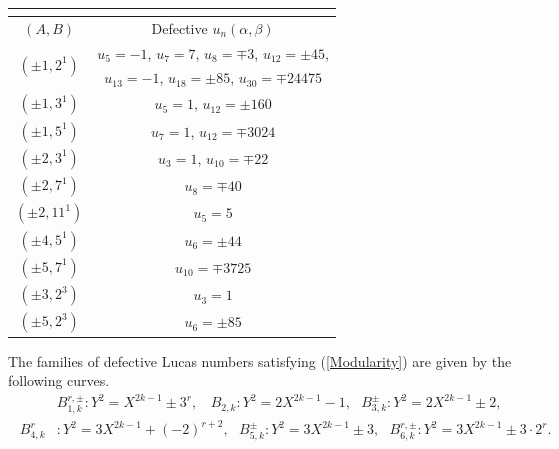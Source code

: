\documentclass[12pt]{amsart}
\newcommand{\?}{\color{red}?}
\numberwithin{equation}{section}
\begin{document}
\begingroup
\setlength{\tabcolsep}{3pt} %
\renewcommand{\arraystretch}{1.5}
\begin{center} %
\begin{table}[!ht]
\begin{tabular}{|c|c|}
\multicolumn{2}{c}{} \\ \hline
$(A,B)$ & Defective $u_n(\alpha, \beta)$ \\ \hline \hline
\multirow{2}{3.5em}{$(\pm 1,2^1)$} & $u_5 = -1$, $u_7 = 7$, $u_8 = \mp 3$, $u_{12} = \pm 45$, \\ & $u_{13} = -1$, $u_{18} = \pm 85$, $u_{30} = \mp 24475$ \\ \hline
$(\pm 1,3^1)$ & $u_5 = 1$, $u_{12} = \pm 160$ \\ \hline
$(\pm 1, 5^1)$ & $u_7 = 1$, $u_{12} = \mp 3024$ \\ \hline
$(\pm 2, 3^1)$ & $u_3 = 1$, $u_{10} = \mp 22$ \\ \hline
$(\pm 2,7^1)$ & $u_8 = \mp 40$ \\ \hline
$(\pm 2, 11^1)$ & $u_5 = 5$ \\ \hline
$(\pm 4, 5^1)$ & $u_6=\pm 44$\\ \hline
$(\pm 5, 7^1)$ & $u_{10} = \mp 3725$ \\ \hline
$(\pm 3, 2^3)$ & $u_3 = 1$ \\ \hline
$(\pm 5, 2^3)$ & $u_6 = \pm 85$ \\ \hline
\end{tabular}
\medskip
{} 
\label{table1}
\end{table}
\end{center}
\endgroup



\noindent
The families of defective Lucas numbers satisfying (\ref{Modularity}) are given
 by the following curves.
\begin{equation}\label{Table2Curves}
\begin{split}
 \ \ \ \ \ \ &B_{1, k}^{r, \pm} : Y^2 = X^{2k-1} \pm 3^r, \ \ \ \   B_{2,k} : Y^2 = 2X^{2k-1} - 1, \ \ \ B_{3, k}^\pm : Y^2 = 2X^{2k-1} \pm 2, \\ \ \ B_{4,k}^r &: Y^2 =  3X^{2k-1} + (-2)^{r+2}, \ \ \  B_{5,k}^{\pm} : Y^2=3X^{2k-1} \pm 3, \ \ \  B_{6,k}^{r,\pm} : Y^2 = 3X^{2k-1} \pm 3 \cdot 2^r.
\end{split}
\end{equation}
\end{document}
